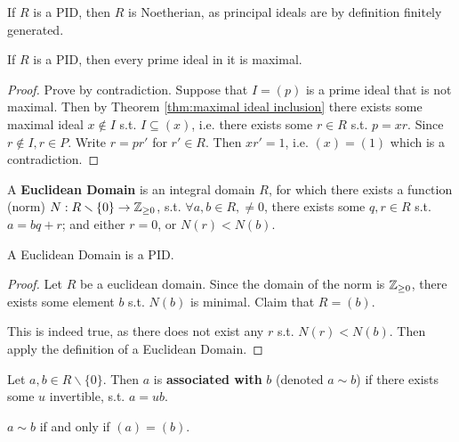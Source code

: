 \documentclass{article}
\begin{document}
\begin{remark}
    If $R$ is a PID, then $R$ is Noetherian, as principal ideals are by definition finitely generated.
\end{remark}

\begin{proposition}\label{prop:PID prime is maximal}
    If $R$ is a PID, then every prime ideal in it is maximal.
\end{proposition}

\begin{proof}
    Prove by contradiction. Suppose that $I = (p)$ is a prime ideal that is not maximal. Then by Theorem \ref{thm:maximal ideal inclusion} there exists some maximal ideal $x\notin I$ s.t. $I \subseteq (x)$, i.e. there exists some $r\in R$ s.t. $p = xr$. Since $r\notin I, r\in P$. Write $r = pr'$ for $r'\in R$. Then $xr'=1$, i.e. $(x) = (1)$ which is a contradiction.
\end{proof}

\begin{definition}
    A \textbf{Euclidean Domain} is an integral domain $R$, for which there exists a function (norm) $N: R\smallsetminus\{0\} \to \mathbb{Z}_{\geq 0}$, s.t. $\forall a, b\in R, \neq 0$, there exists some $q, r\in R$ s.t. $a = bq + r$; and either $r = 0$, or $N(r) < N(b)$.
\end{definition}

\begin{proposition}\label{prop:Euclidean Domain is PID}
    A Euclidean Domain is a PID.
\end{proposition}

\begin{proof}
    Let $R$ be a euclidean domain. Since the domain of the norm is $\mathbb{Z}_{\geq 0}$, there exists some element $b$ s.t. $N(b)$ is minimal. Claim that $R = (b)$.

    This is indeed true, as there does not exist any $r$ s.t. $N(r) < N(b)$. Then apply the definition of a Euclidean Domain.
\end{proof}

\begin{definition}
    Let $a, b\in R\smallsetminus\{0\}$. Then $a$ is \textbf{associated with} $b$ (denoted $a \sim b$) if there exists some $u$ invertible, s.t. $a = ub$.
\end{definition}

\begin{remark}
    $a \sim b$ if and only if $(a) = (b)$.
\end{remark}
\end{document}
